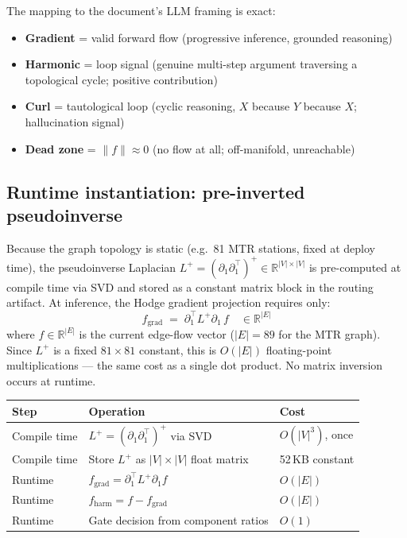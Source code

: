\documentclass[11pt,a4paper]{article}
\begin{document}
The mapping to the document's LLM framing is exact:
\begin{itemize}
  \item \textbf{Gradient} = valid forward flow (progressive inference,
        grounded reasoning)
  \item \textbf{Harmonic} = loop signal (genuine multi-step argument
        traversing a topological cycle; positive contribution)
  \item \textbf{Curl} = tautological loop (cyclic reasoning,
        $X$ because $Y$ because $X$; hallucination signal)
  \item \textbf{Dead zone} = $\|f\| \approx 0$
        (no flow at all; off-manifold, unreachable)
\end{itemize}

\subsection{Runtime instantiation: pre-inverted pseudoinverse}

Because the graph topology is static (e.g.\ 81 MTR stations, fixed
at deploy time), the pseudoinverse Laplacian
$L^+ = (\partial_1\partial_1^\top)^+ \in \mathbb{R}^{|V|\times|V|}$
is pre-computed at compile time via SVD and stored as a constant
matrix block in the routing artifact.
At inference, the Hodge gradient projection requires only:
\[
  f_{\mathrm{grad}}
  \;=\;
  \partial_1^\top L^+ \partial_1 \, f
  \quad\in\mathbb{R}^{|E|}
\]
where $f\in\mathbb{R}^{|E|}$ is the current edge-flow vector
($|E|=89$ for the MTR graph).
Since $L^+$ is a fixed $81\times81$ constant, this is $O(|E|)$
floating-point multiplications --- the same cost as a single
dot product.
No matrix inversion occurs at runtime.

\begin{center}
\renewcommand{\arraystretch}{1.3}\small
\begin{tabular}{lll}
\toprule
\textbf{Step} & \textbf{Operation} & \textbf{Cost} \\
\midrule
Compile time & $L^+ = (\partial_1\partial_1^\top)^+$ via SVD &
  $O(|V|^3)$, once \\
Compile time & Store $L^+$ as $|V|\times|V|$ float matrix &
  52\,KB constant \\
Runtime & $f_{\mathrm{grad}} = \partial_1^\top L^+ \partial_1 f$ &
  $O(|E|)$ \\
Runtime & $f_{\mathrm{harm}} = f - f_{\mathrm{grad}}$ &
  $O(|E|)$ \\
Runtime & Gate decision from component ratios &
  $O(1)$ \\
\bottomrule
\end{tabular}
\end{center}
\end{document}
